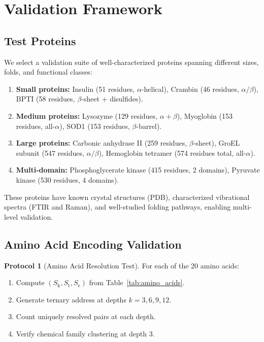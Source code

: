 \documentclass[11pt,twocolumn,a4paper]{article}
\theoremstyle{definition}
\newtheorem{protocol}[theorem]{Protocol}
\theoremstyle{remark}
\newcommand{\Sk}{S_{\mathrm{k}}}
\newcommand{\St}{S_{\mathrm{t}}}
\newcommand{\Se}{S_{\mathrm{e}}}
\begin{document}
\section{Validation Framework}
\label{sec:validation}

\subsection{Test Proteins}

We select a validation suite of well-characterized proteins spanning different sizes, folds, and functional classes:

\begin{enumerate}[nosep]
\item \textbf{Small proteins:} Insulin (51 residues, $\alpha$-helical), Crambin (46 residues, $\alpha/\beta$), BPTI (58 residues, $\beta$-sheet + disulfides).
\item \textbf{Medium proteins:} Lysozyme (129 residues, $\alpha + \beta$), Myoglobin (153 residues, all-$\alpha$), SOD1 (153 residues, $\beta$-barrel).
\item \textbf{Large proteins:} Carbonic anhydrase II (259 residues, $\beta$-sheet), GroEL subunit (547 residues, $\alpha/\beta$), Hemoglobin tetramer (574 residues total, all-$\alpha$).
\item \textbf{Multi-domain:} Phosphoglycerate kinase (415 residues, 2 domains), Pyruvate kinase (530 residues, 4 domains).
\end{enumerate}

These proteins have known crystal structures (PDB), characterized vibrational spectra (FTIR and Raman), and well-studied folding pathways, enabling multi-level validation.

\subsection{Amino Acid Encoding Validation}

\begin{protocol}[Amino Acid Resolution Test]
\label{prot:aa_test}
For each of the 20 amino acids:
\begin{enumerate}[nosep]
\item Compute $(\Sk, \St, \Se)$ from Table~\ref{tab:amino_acids}.
\item Generate ternary address at depths $k = 3, 6, 9, 12$.
\item Count uniquely resolved pairs at each depth.
\item Verify chemical family clustering at depth 3.
\end{enumerate}
\end{protocol}
\end{document}
